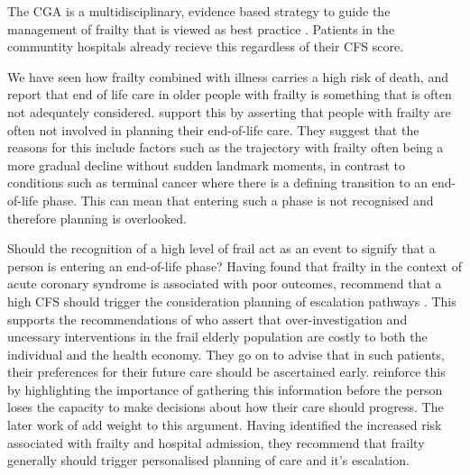 \documentclass[12pt,a4paper,oneside,titlepage]{article}
\begin{document}
The CGA is a multidisciplinary, evidence based strategy to guide the management 
of frailty that is viewed as best practice \parencite{silver:12, bgs:14, oliver:14}. Patients
in the communtity hospitals already recieve this regardless of their CFS score.

We have seen how frailty combined with illness carries a high risk of death, and 
\textcite{silver:12} report that end of life care in older people with frailty
is something that is often not adequately considered. \textcite{oliver:14} support this
by asserting that people with frailty are often not involved in planning their 
end-of-life care. They suggest that the reasons for this include factors such as
the trajectory with frailty often being a more gradual decline without sudden 
landmark moments, in contrast to conditions such as terminal cancer where there 
is a defining transition to an end-of-life phase. This can mean that entering such a
phase is not recognised and therefore planning is overlooked. 

Should the recognition of a high level of frail act as an event to signify
that a person is entering an end-of-life phase? Having found that frailty in the 
context of acute coronary syndrome is associated
with poor outcomes, \textcite{kang:15} recommend that a high CFS should
trigger the consideration planning of escalation pathways \parencite{kang:15}.
This supports the recommendations of \textcite{silver:12} who assert that over-investigation
and uncessary interventions in the frail elderly population are costly to both the
individual and the health economy. They go on to advise that in such patients, 
their preferences for their future care should be ascertained early. \textcite{oliver:14} 
reinforce this by highlighting the importance of gathering this information
before the person loses the capacity to make decisions about how their care should
progress. The later work of \textcite{romero-ortuno:16} add weight to this argument.
Having identified the increased risk associated with frailty and hospital admission, 
they recommend that frailty generally should trigger personalised planning of
care and it's escalation.
\end{document}

